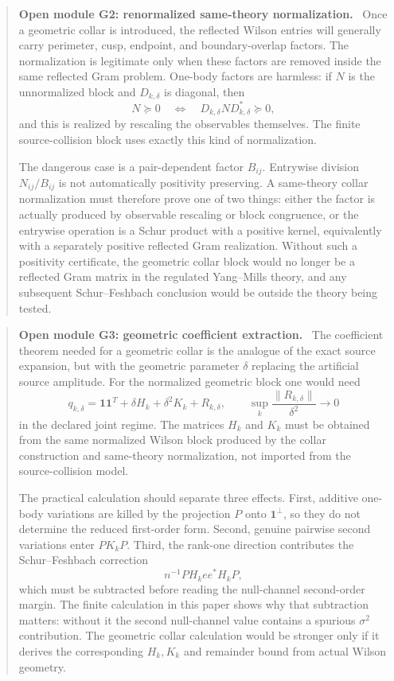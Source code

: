 \documentclass[11pt]{article}
\newcommand{\one}{\mathbf 1}
\newcommand{\norm}[1]{\lVert #1\rVert}
\newenvironment{openmodule}[1]
{\begin{quote}\color{red!55!black}\textbf{Open module #1.}\ }
{\end{quote}}
\begin{document}
\begin{openmodule}{G2: renormalized same-theory normalization}
Once a geometric collar is introduced, the reflected Wilson entries will generally carry perimeter, cusp, endpoint, and boundary-overlap factors.  The normalization is legitimate only when these factors are removed inside the same reflected Gram problem.  One-body factors are harmless: if \(N\) is the unnormalized block and \(D_{k,\delta}\) is diagonal, then
\[
  N\succeq0
  \quad\Longleftrightarrow\quad
  D_{k,\delta}ND_{k,\delta}^{*}\succeq0,
\]
and this is realized by rescaling the observables themselves.  The finite source-collision block uses exactly this kind of normalization.

The dangerous case is a pair-dependent factor \(B_{ij}\).  Entrywise division \(N_{ij}/B_{ij}\) is not automatically positivity preserving.  A same-theory collar normalization must therefore prove one of two things: either the factor is actually produced by observable rescaling or block congruence, or the entrywise operation is a Schur product with a positive kernel, equivalently with a separately positive reflected Gram realization.  Without such a positivity certificate, the geometric collar block would no longer be a reflected Gram matrix in the regulated Yang--Mills theory, and any subsequent Schur--Feshbach conclusion would be outside the theory being tested.
\end{openmodule}

\begin{openmodule}{G3: geometric coefficient extraction}
The coefficient theorem needed for a geometric collar is the analogue of the exact source expansion, but with the geometric parameter \(\delta\) replacing the artificial source amplitude.  For the normalized geometric block one would need
\[
  q_{k,\delta}
  =
  \one\one^T+\delta H_k+\delta^2K_k+R_{k,\delta},
  \qquad
  \sup_k\frac{\norm{R_{k,\delta}}}{\delta^2}\longrightarrow0
\]
in the declared joint regime.  The matrices \(H_k\) and \(K_k\) must be obtained from the same normalized Wilson block produced by the collar construction and same-theory normalization, not imported from the source-collision model.

The practical calculation should separate three effects.  First, additive one-body variations are killed by the projection \(P\) onto \(\one^\perp\), so they do not determine the reduced first-order form.  Second, genuine pairwise second variations enter \(PK_kP\).  Third, the rank-one direction contributes the Schur--Feshbach correction
\[
  n^{-1}PH_k ee^*H_kP,
\]
which must be subtracted before reading the null-channel second-order margin.  The finite calculation in this paper shows why that subtraction matters: without it the second null-channel value contains a spurious \(\sigma^2\) contribution.  The geometric collar calculation would be stronger only if it derives the corresponding \(H_k,K_k\) and remainder bound from actual Wilson geometry.
\end{openmodule}
\end{document}
